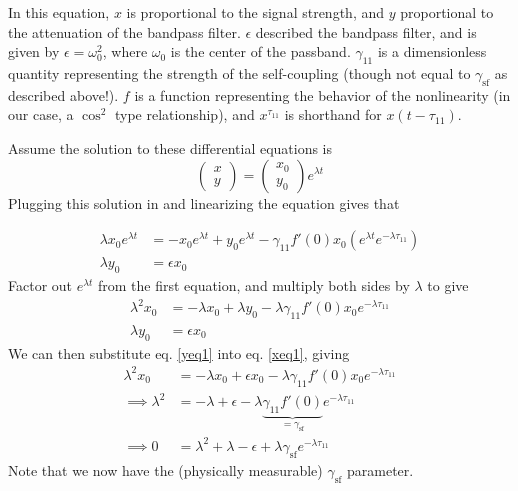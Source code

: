 \documentclass{article}
\newcommand{\self}{{\text{sf}}}
\begin{document}
    In this equation, $x$ is proportional to the signal strength, and $y$ proportional to the attenuation of the bandpass filter. $\epsilon$ described the bandpass filter, and is given by $\epsilon = \omega_0^2$, where $\omega_0$ is the center of the passband. $\gamma_{11}$ is a dimensionless quantity representing the strength of the self-coupling (though not equal to $\gamma_{\self}$ as described above!). $f$ is a function representing the behavior of the nonlinearity (in our case, a $\cos^2$ type relationship), and $x^{\tau_{11}}$ is shorthand for $x(t-\tau_{11})$.

    Assume the solution to these differential equations is
    \begin{equation}
        \begin{pmatrix}
            x \\ y
        \end{pmatrix} = 
        \begin{pmatrix}
            x_0 \\ y_0
        \end{pmatrix}e^{\lambda t}
    \end{equation}
    Plugging this solution in and linearizing the equation gives that

    \begin{equation*}
        \begin{aligned}
            \lambda x_0 e^{\lambda t} &= -x_0 e^{\lambda t} + y_0 e^{\lambda t} - \gamma_{11}f'(0)x_0 (e^{\lambda t}e^{-\lambda \tau_{11}}) \\
            \lambda y_0 &= \epsilon x_0
        \end{aligned}
    \end{equation*}
    Factor out $e^{\lambda t}$ from the first equation, and multiply both sides by $\lambda$ to give
    \begin{align}
        \lambda^2 x_0 &= -\lambda x_0 + \lambda y_0 - \lambda \gamma_{11}f'(0)x_0 e^{-\lambda \tau_{11}} \label{xeq1}\\
        \lambda y_0 &= \epsilon x_0 \label{yeq1}
    \end{align}
    We can then substitute eq. \ref{yeq1} into eq. \ref{xeq1}, giving
    \begin{align}
        \nonumber \lambda^2 x_0 &= -\lambda x_0 + \epsilon x_0 - \lambda \gamma_{11}f'(0)x_0 e^{-\lambda \tau_{11}} \\
        \nonumber \implies \lambda^2 &= -\lambda + \epsilon - \lambda \underbrace{\gamma_{11}f'(0)}_{=\gamma_\self}e^{-\lambda \tau_{11}} \\
        \label{leqrr} \implies 0 &= \lambda^2 + \lambda - \epsilon + \lambda \gamma_{\self}e^{-\lambda \tau_{11}}
    \end{align}
    Note that we now have the (physically measurable) $\gamma_\self$ parameter.
\end{document}
